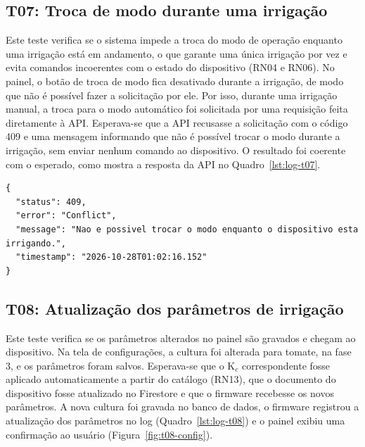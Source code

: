 \subsection{T07: Troca de modo durante uma irrigação}

Este teste verifica se o sistema impede a troca do modo de operação enquanto uma irrigação está em andamento, o que garante uma única irrigação por vez e evita comandos incoerentes com o estado do dispositivo (RN04 e RN06). No painel, o botão de troca de modo fica desativado durante a irrigação, de modo que não é possível fazer a solicitação por ele. Por isso, durante uma irrigação manual, a troca para o modo automático foi solicitada por uma requisição feita diretamente à API. Esperava-se que a API recusasse a solicitação com o código 409 e uma mensagem informando que não é possível trocar o modo durante a irrigação, sem enviar nenhum comando ao dispositivo. O resultado foi coerente com o esperado, como mostra a resposta da API no Quadro~\ref{lst:log-t07}.

\vspace{0.6\baselineskip}
\noindent\begin{minipage}{\linewidth}
\begin{lstlisting}[language={}, caption={Resposta da API à troca de modo durante uma irrigação (T07)}, label={lst:log-t07}]
{
  "status": 409,
  "error": "Conflict",
  "message": "Nao e possivel trocar o modo enquanto o dispositivo esta irrigando.",
  "timestamp": "2026-10-28T01:02:16.152"
}
\end{lstlisting}
\vspace{-0.5\baselineskip}
\end{minipage}
\medskip

\subsection{T08: Atualização dos parâmetros de irrigação}

Este teste verifica se os parâmetros alterados no painel são gravados e chegam ao dispositivo. Na tela de configurações, a cultura foi alterada para tomate, na fase 3, e os parâmetros foram salvos. Esperava-se que o K$_c$ correspondente fosse aplicado automaticamente a partir do catálogo (RN13), que o documento do dispositivo fosse atualizado no Firestore e que o firmware recebesse os novos parâmetros. A nova cultura foi gravada no banco de dados, o firmware registrou a atualização dos parâmetros no log (Quadro~\ref{lst:log-t08}) e o painel exibiu uma confirmação ao usuário (Figura~\ref{fig:t08-config}).

